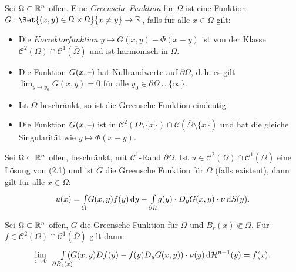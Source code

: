 \documentclass{cheat-sheet}
\newcommand{\HM}{\mathcal{H}} %
\begin{document}
\begin{defn}
  Sei $\Omega \subset \mathbb{R}^n$ offen. Eine \emph{Greensche Funktion} für $\Omega$ ist eine Funktion
  $G : \Set{ (x, y) \in \Omega \times \Omega }{ x \not= y } \to \R$, falls für alle $x \in \Omega$ gilt:
  \begin{itemize}
    \item Die \emph{Korrektorfunktion} $y \mapsto G(x, y) - \Phi(x - y)$ ist von der Klasse $\mathcal{C}^2(\Omega) \cap \mathcal{C}^1(\overline{\Omega})$ und ist harmonisch in $\Omega$. %
    \item Die Funktion $G(x, \text{--})$ hat Nullrandwerte auf $\partial \Omega$, d.\,h. es gilt $\lim_{y \to y_0} G(x, y) = 0$ für alle $y_0 \in \partial \Omega \cup \{ \infty \}$.
  \end{itemize}
\end{defn}


\begin{bem}
  \begin{itemize}
    \item Ist $\Omega$ beschränkt, so ist die Greensche Funktion eindeutig.
    \item Die Funktion $G(x, \text{--})$ ist in $\mathcal{C}^2(\Omega \setminus \{ x \}) \cap \mathcal{C}(\overline{\Omega} \setminus \{ x \})$ und hat die gleiche Singularität wie $y \mapsto \Phi(x - y)$.
  \end{itemize}
\end{bem}

\begin{satz}
  Sei $\Omega \subset \mathbb{R}^n$ offen, beschränkt, mit $\mathcal{C}^1$-Rand $\partial \Omega$. Ist $u \in \mathcal{C}^2(\Omega) \cap \mathcal{C}^1(\overline{\Omega})$ eine Lösung von (2.1) und ist $G$ die Greensche Funktion für $\Omega$ (falls existent), dann gilt für alle $x \in \Omega$:
  \[ u(x) = {\textstyle \int\limits_{\Omega}^{}} G(x,y) f(y) \,\mathrm{d} y - {\textstyle \int\limits_{\partial \Omega}^{}} g(y) \cdot D_y G(x,y) \cdot \nu \,\mathrm{d} S(y). \]
\end{satz}


\begin{lem}
  Sei $\Omega \subset \mathbb{R}^n$ offen, $G$ die Greensche Funktion für $\Omega$ und $B_r(x) \Subset \Omega$. Für $f \in \mathcal{C}^2(\Omega) \cap \mathcal{C}^1(\overline{\Omega})$ gilt dann:
  \[ \lim_{\epsilon \to 0} \quad\enspace \Int{\mathclap{\partial B_{\epsilon}(x)}}{}{\left( G(x, y) Df(y) - f(y) D_y G(x, y) \right) \cdot \nu(y) }{\HM^{n-1}(y)} = f(x). \]
\end{lem}
\end{document}
